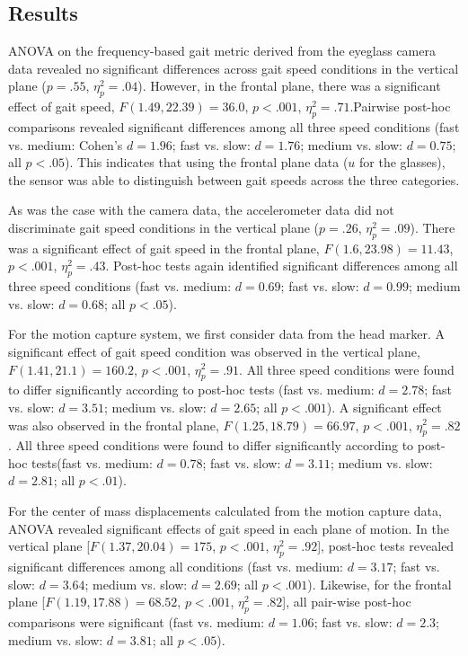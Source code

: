 \documentclass[12pt]{report}
\begin{document}
\subsection{Results}
ANOVA on the frequency-based gait metric derived from the eyeglass camera data revealed no significant differences across gait speed conditions in the vertical plane ($p= .55$, $\eta^2_p = .04$). However, in the frontal plane, there was a significant effect of gait speed, $F(1.49, 22.39) = 36.0$, $p < .001$, $\eta^2_p = .71$.Pairwise post-hoc comparisons revealed significant differences among all three speed conditions (fast vs. medium: Cohen's $d= 1.96$; fast vs. slow: $d= 1.76$; medium vs. slow: $d= 0.75$; all $p< .05$). This indicates that using the frontal plane data ($u$ for the glasses), the sensor was able to distinguish between gait speeds across the three categories. 
 
As was the case with the camera data, the accelerometer data did not discriminate gait speed conditions in the vertical plane ($p= .26$, $\eta^2_p = .09$). There was a significant effect of gait speed in the frontal plane, $F(1.6, 23.98) = 11.43$, $p < .001$, $\eta^2_p = .43$. Post-hoc tests again identified significant differences among all three speed conditions (fast vs. medium: $d = 0.69$; fast vs. slow: $d= 0.99$; medium vs. slow: $d= 0.68$; all $p < .05$).
 
For the motion capture system, we first consider data from the head marker. A significant effect of gait speed condition was observed in the vertical plane, $F(1.41, 21.1) = 160.2$, $p < .001$, $\eta^2_p = .91$. All three speed conditions were found to differ significantly according to post-hoc tests (fast vs. medium: $d= 2.78$; fast vs. slow: $d= 3.51$; medium vs. slow: $d= 2.65$; all $p< .001$). A significant effect was also observed in the frontal plane, $F(1.25, 18.79) = 66.97$, $p < .001$, $\eta^2_p = .82$. All three speed conditions were found to differ significantly according to post-hoc tests(fast vs. medium: $d= 0.78$; fast vs. slow: $d= 3.11$; medium vs. slow: $d= 2.81$; all $p< .01$).
 
For the center of mass displacements calculated from the motion capture data, ANOVA revealed significant effects of gait speed in each plane of motion. In the vertical plane [$F(1.37,20.04) = 175$, $p < .001$, $\eta^2_p = .92$], post-hoc tests revealed significant differences among all conditions (fast vs. medium: $d= 3.17$; fast vs. slow: $d= 3.64$; medium vs. slow: $d= 2.69$; all $p< .001$). Likewise, for the frontal plane [$F(1.19,17.88) = 68.52$, $p< .001$, $\eta^2_p = .82$], all pair-wise post-hoc comparisons were significant (fast vs. medium: $d= 1.06$; fast vs. slow: $d= 2.3$; medium vs. slow: $d= 3.81$; all $p< .05$).
\end{document}
